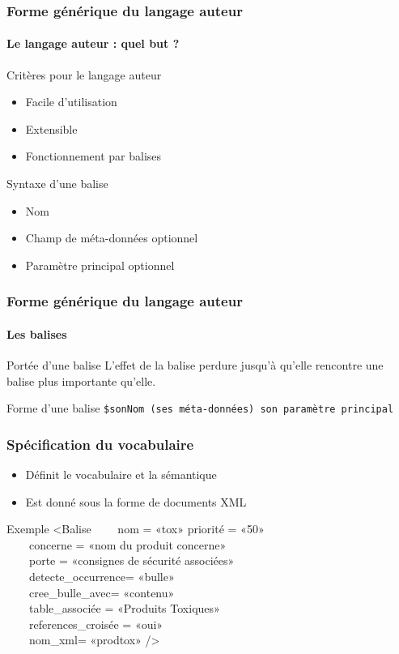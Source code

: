 \begin{frame}
	\frametitle{Forme générique du langage auteur}
	\framesubtitle{Le langage auteur : quel but ?}

	\begin{block}{Critères pour le langage auteur}
		\begin{itemize}
			\item Facile d'utilisation
			\item Extensible
			\item Fonctionnement par balises
		\end{itemize}
	\end{block}

	\begin{block}{Syntaxe d'une balise}
		\begin{itemize}
			\item Nom
			\item Champ de méta-données optionnel
			\item Paramètre principal optionnel
		\end{itemize}
	\end{block}
\end{frame}

\begin{frame}
	\frametitle{Forme générique du langage auteur}
	\framesubtitle{Les balises}

	\begin{block}{Portée d'une balise}
		L'effet de la balise perdure jusqu'à qu'elle rencontre
		une balise plus importante qu'elle.
	\end{block}

	\begin{block}{Forme d'une balise}
		\texttt{\$sonNom (ses méta-données) son paramètre principal}
	\end{block}
\end{frame}

\begin{frame}
	\frametitle{Spécification du vocabulaire}

	\begin{itemize}
		\item Définit le vocabulaire et la sémantique
		\item Est donné sous la forme de documents XML
	\end{itemize}

	\begin{block}{Exemple}
		<Balise
		\ \ \ \	nom = «tox» priorité = «50» \\
		\ \ \ \	concerne = «nom du produit concerne» \\
		\ \ \ \	porte = «consignes de sécurité associées» \\
		\ \ \ \	detecte\_occurrence= «bulle» \\
		\ \ \ \	cree\_bulle\_avec= «contenu» \\
		\ \ \ \	table\_associée = «Produits Toxiques» \\
		\ \ \ \	references\_croisée = «oui» \\
		\ \ \ \	nom\_xml= «prodtox» /> \\
	\end{block}
\end{frame}

